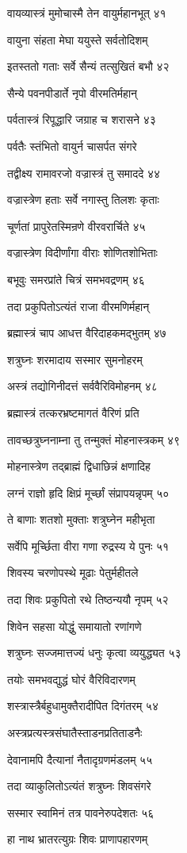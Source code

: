 वायव्यास्त्रं मुमोचास्मै तेन वायुर्महानभूत् ४१

वायुना संहता मेघा ययुस्ते सर्वतोदिशम्

इतस्ततो गताः सर्वे सैन्यं तत्सुखितं बभौ ४२

सैन्ये पवनपीडार्ते नृपो वीरमतिर्महान्

पर्वतास्त्रं रिपूद्धारि जग्राह च शरासने ४३

पर्वतैः स्तंभितो वायुर्न चासर्पत संगरे

तद्वीक्ष्य रामावरजो वज्रास्त्रं तु समाददे ४४

वज्रास्त्रेण हताः सर्वे नगास्तु तिलशः कृताः

चूर्णतां प्रापुरेतस्मिन्रणे वीरवरार्चिते ४५

वज्रास्त्रेण विदीर्णांगा वीराः शोणितशोभिताः

बभूवुः समरप्रांते चित्रं समभवद्रणम् ४६

तदा प्रकुपितोऽत्यंतं राजा वीरमणिर्महान्

ब्रह्मास्त्रं चाप आधत्त वैरिदाहकमद्भुतम् ४७

शत्रुघ्नः शरमादाय सस्मार सुमनोहरम्

अस्त्रं तद्योगिनीदत्तं सर्ववैरिविमोहनम् ४८

ब्रह्मास्त्रं तत्करभ्रष्टमागतं वैरिणं प्रति

तावच्छत्रुघ्ननाम्ना तु तन्मुक्तं मोहनास्त्रकम् ४९

मोहनास्त्रेण तद्ब्राह्मं द्विधाछिन्नं क्षणादिह

लग्नं राज्ञो हृदि क्षिप्रं मूर्च्छां संप्रापयन्नृपम् ५०

ते बाणाः शतशो मुक्ताः शत्रुघ्नेन महीभृता

सर्वेपि मूर्च्छिता वीरा गणा रुद्रस्य ये पुनः ५१

शिवस्य चरणोपस्थे मूढाः पेतुर्महीतले

तदा शिवः प्रकुपितो रथे तिष्ठन्ययौ नृपम् ५२

शिवेन सहसा योद्धुं समायातो रणांगणे

शत्रुघ्नः सज्जमात्तज्यं धनुः कृत्वा व्ययुद्ध्यत ५३

तयोः समभवद्युद्धं घोरं वैरिविदारणम्

शस्त्रास्त्रैर्बहुधामुक्तैरादीपित दिगंतरम् ५४

अस्त्रप्रत्यस्त्रसंघातैस्ताडनप्रतिताडनैः

देवानामपि दैत्यानां नैतादृग्रणमंडलम् ५५

तदा व्याकुलितोऽत्यंतं शत्रुघ्नः शिवसंगरे

सस्मार स्वामिनं तत्र पावनेरुपदेशतः ५६

हा नाथ भ्रातरत्युग्रः शिवः प्राणापहारणम्

